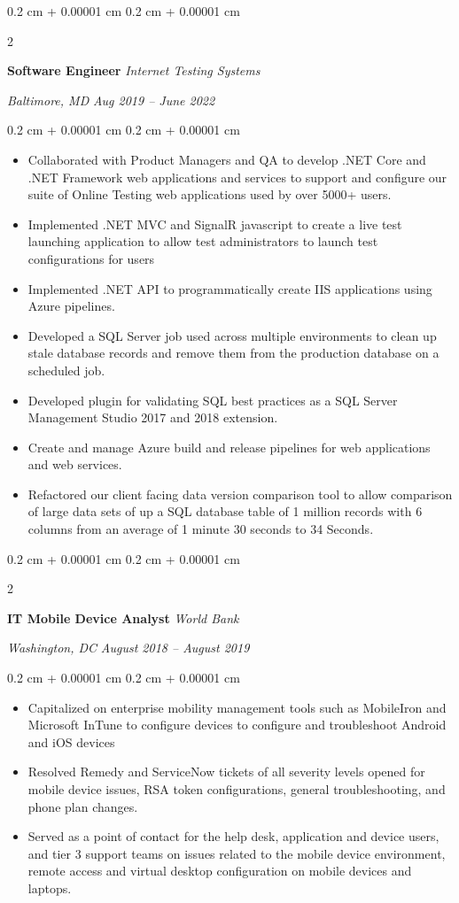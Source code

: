 \documentclass[10pt, letterpaper]{article}
\newenvironment{highlights}{
    \begin{itemize}[
        topsep=0.10 cm,
        parsep=0.10 cm,
        partopsep=0pt,
        itemsep=0pt,
        leftmargin=0.4 cm + 10pt
        ]
    }{
\end{itemize}
} %
\newenvironment{onecolentry}{
    \begin{adjustwidth}{
            0.2 cm + 0.00001 cm
        }{
            0.2 cm + 0.00001 cm
        }
    }{
    \end{adjustwidth}
} %
\newenvironment{twocolentry}[2][]{
    \onecolentry
    \def\secondColumn{#2}
    \setcolumnwidth{\fill, 10.5 cm}
    \begin{paracol}{2}
    }{
        \switchcolumn \raggedleft \secondColumn
    \end{paracol}
    \endonecolentry
} %
\begin{document}
    \vspace{0.2 cm}
    \begin{twocolentry}{
            \textit{Baltimore, MD}
        \textit{Aug 2019 – June 2022}}
        \textbf{Software Engineer}
        \textit{Internet Testing Systems}
    \end{twocolentry}
    \vspace{0.10 cm}
    \begin{onecolentry}
        \begin{highlights}
        \item Collaborated with Product Managers and QA to develop .NET Core and .NET Framework web applications and services to support and configure our suite of Online Testing web applications used by over 5000+ users.
        \item Implemented .NET MVC and SignalR javascript to create a live test launching application to allow test administrators to launch test configurations for users 
        \item Implemented .NET API to programmatically create IIS applications using Azure pipelines.
        \item Developed a SQL Server job used across multiple environments to clean up stale database records and remove them from the production database on a scheduled job.
        \item Developed plugin for validating SQL best practices as a SQL Server Management Studio 2017 and 2018 extension.
        \item Create and manage Azure build and release pipelines for web applications and web services.
        \item Refactored our client facing data version comparison tool to allow comparison of large data sets of up a SQL database table of 1 million records with 6 columns from an average of 1 minute 30 seconds to  34 Seconds.
        \end{highlights}
    \end{onecolentry}
    \begin{twocolentry}{
        \textit{Washington, DC}
        \textit{August 2018 – August 2019}}
        \textbf{IT Mobile Device Analyst}
        \textit{World Bank}
    \end{twocolentry}
    \vspace{0.10 cm}
    \begin{onecolentry}
        \begin{highlights}
        \item Capitalized on enterprise mobility management tools such as MobileIron and Microsoft InTune to configure devices to configure and troubleshoot Android and iOS devices
        \item Resolved Remedy and ServiceNow tickets of all severity levels opened for mobile device issues, RSA token configurations, general troubleshooting, and phone plan changes.
        \item Served as a point of contact for the help desk, application and device users, and tier 3 support teams on issues related to the mobile device environment, remote access and virtual desktop configuration on mobile devices and laptops.
        \end{highlights}
    \end{onecolentry}
\end{document}
